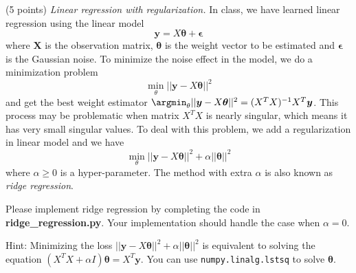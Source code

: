 \documentclass[a4paper, 12pt]{exam}
\begin{document}
	\begin{questions}
		\question (5 points) \emph{Linear regression with regularization.} In class, we have learned linear regression using the linear model
		\begin{equation*}
		\bm{y} = X\bm{\theta} + \bm{\epsilon}
		\end{equation*}
		where $\bm{X}$ is the observation matrix,
		$\bm{\theta}$ is the weight vector to be estimated and $\bm{\epsilon}$ is the Gaussian noise. To minimize the noise effect in the model, we do a minimization problem
		\begin{equation*}
		\min_{\theta}||\bm{y} - X\bm{\theta}||^2
		\end{equation*}
		and get the best weight estimator
		$\argmin_{\theta}||\bm{y} - X\bm{\theta}||^2 = (X^TX)^{-1}X^T\bm{y}$.
		This process may be problematic when matrix $X^TX$ is nearly singular, which means it has very small singular values. %
		To deal with this problem, we add a regularization in linear model and we have
		\begin{equation*}
		\min_{\theta} ||\bm{y} - X\bm{\theta}||^2 + \alpha ||\bm{\theta}||^2
		\end{equation*}
		where $\alpha \geq 0$ is a hyper-parameter. The method with extra $\alpha$ is also known as {\em ridge regression}.
		
		Please implement ridge regression  by completing the code in  \textbf{ridge\_regression.py}.
		Your implementation should handle the case when $\alpha=0$.
		
		Hint: Minimizing the loss $||\bm{y} - X\bm{\theta}||^2 + \alpha ||\bm{\theta}||^2$ is equivalent to solving the equation
		$( X^T X+ \alpha I)\bm{\theta}  = X^T \bm{y}$. You can use \texttt{numpy.linalg.lstsq} to solve $\bm{\theta}$.
		

\end{questions}
\end{document}
